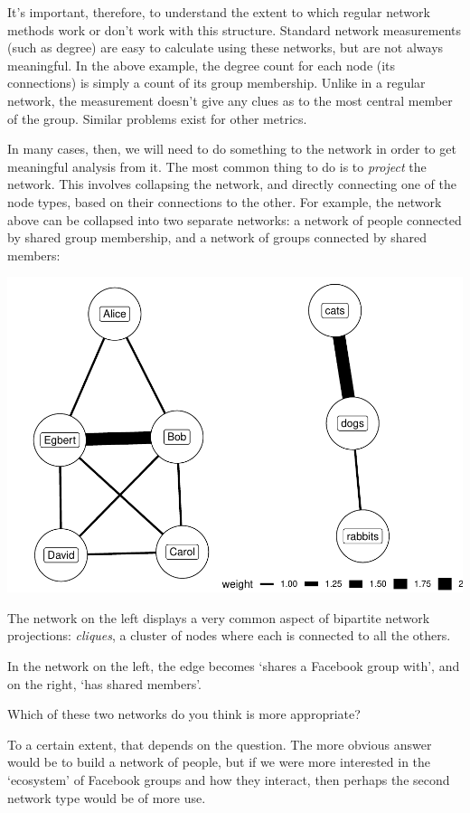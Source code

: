 \documentclass[
]{book}
\begin{document}
It's important, therefore, to understand the extent to which regular network methods work or don't work with this structure. Standard network measurements (such as degree) are easy to calculate using these networks, but are not always meaningful. In the above example, the degree count for each node (its connections) is simply a count of its group membership. Unlike in a regular network, the measurement doesn't give any clues as to the most central member of the group. Similar problems exist for other metrics.

In many cases, then, we will need to do something to the network in order to get meaningful analysis from it. The most common thing to do is to \emph{project} the network. This involves collapsing the network, and directly connecting one of the node types, based on their connections to the other. For example, the network above can be collapsed into two separate networks: a network of people connected by shared group membership, and a network of groups connected by shared members:

\includegraphics{_main_files/figure-latex/unnamed-chunk-70-1.pdf}

The network on the left displays a very common aspect of bipartite network projections: \emph{cliques}, a cluster of nodes where each is connected to all the others.

In the network on the left, the edge becomes `shares a Facebook group with', and on the right, `has shared members'.

Which of these two networks do you think is more appropriate?

To a certain extent, that depends on the question. The more obvious answer would be to build a network of people, but if we were more interested in the `ecosystem' of Facebook groups and how they interact, then perhaps the second network type would be of more use.
\end{document}
